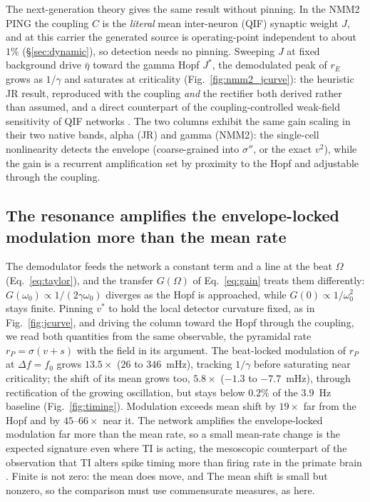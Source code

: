\documentclass[11pt,a4paper]{article}
\newcommand{\Sig}{\sigma}
\providecommand{\DIFaddtex}[1]{{\protect\color{blue} \sf #1}} %
\providecommand{\DIFdeltex}[1]{{\protect\color{red} \scriptsize #1}} %
\providecommand{\DIFaddbegin}{} %
\providecommand{\DIFaddend}{} %
\providecommand{\DIFdelbegin}{} %
\providecommand{\DIFdelend}{} %
\providecommand{\DIFadd}[1]{\texorpdfstring{\DIFaddtex{#1}}{#1}} %
\providecommand{\DIFdel}[1]{\texorpdfstring{\DIFdeltex{#1}}{}} %
\begin{document}
The next-generation theory gives the same result without pinning. In the NMM2 PING the
coupling $C$ is the \emph{literal} mean inter-neuron (QIF) synaptic weight $J$, and at this
carrier the generated source is operating-point independent to about $1\%$
(\S\ref{sec:dynamic}), so detection needs no pinning. Sweeping $J$ at fixed background drive
$\bar\eta$ toward the gamma Hopf $J^*$, the demodulated peak of $r_E$ grows as
$1/\gamma$ and saturates at criticality (Fig.~\ref{fig:nmm2_jcurve}): the heuristic JR
result, reproduced with the coupling \emph{and} the rectifier both derived rather than
assumed, and a direct counterpart of the coupling-controlled weak-field sensitivity of
QIF networks \cite{clusella2023}. The two columns exhibit the same gain scaling in
their two native bands, alpha (JR) and gamma (NMM2): the single-cell nonlinearity
detects the envelope (coarse-grained into $\Sig''$, or the exact $v^2$), while the
gain is a recurrent amplification set by proximity to the
Hopf and adjustable through the coupling.

\subsection{The resonance amplifies the envelope-locked modulation more than the mean rate}\label{sec:timing}
The demodulator feeds the network a constant term and a line at the beat $\Omega$
(Eq.~\eqref{eq:taylor}), and the transfer $G(\Omega)$ of Eq.~\eqref{eq:gain} treats them
differently: $G(\omega_0)\propto1/(2\gamma\omega_0)$ diverges as the Hopf is approached,
while $G(0)\propto1/\omega_0^2$ stays finite. Pinning $v^*$ to hold the local detector
curvature fixed, as in Fig.~\ref{fig:jcurve}, and driving the column toward the Hopf
through the coupling, we read both quantities from the same observable, the pyramidal
rate $r_P=\Sig(v+s)$ with the field in its argument. The beat-locked modulation of $r_P$ at
$\Delta f=f_0$ grows $13.5\times$ ($26$ to $346$~mHz), tracking $1/\gamma$ before
saturating near criticality; the shift of its mean grows too, $5.8\times$ ($-1.3$ to
$-7.7$~mHz), through rectification of the growing oscillation, but stays below $0.2\%$ of
the $3.9$~Hz baseline (Fig.~\ref{fig:timing}). Modulation exceeds mean shift by $19\times$
far from the Hopf and by $45$--$66\times$ near it. The network amplifies the
envelope-locked modulation far more than the mean rate, so a small mean-rate change is
the expected signature even where TI is acting, the mesoscopic counterpart of the
observation that TI alters spike timing more than firing rate in the primate brain
\cite{vieira2024}. \DIFdelbegin \DIFdel{Finite is not zero: the mean does move, and }\DIFdelend \DIFaddbegin \DIFadd{The mean shift is small but nonzero, so }\DIFaddend the comparison must use
commensurate measures, as here.
\end{document}
